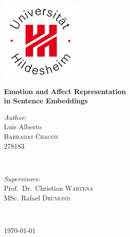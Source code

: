\documentclass[a4paper,12pt]{report}
\begin{document}
\begin{titlepage}
\center %

\vspace{-1cm}
\includegraphics[width=4cm]{img/logoUHi.jpg}
\vspace{2cm}

{ \Large \bfseries Emotion and Affect Representation}\\
\vspace{0.5cm}
{ \Large \bfseries in Sentence Embeddings}\\
\vspace{0.5cm}
\vspace{2cm}

\begin{minipage}{0.4\textwidth}
  \begin{flushleft} \large
  \emph{Author:}\\
  Luis Alberto \\
  \textsc{Barradas Chacón} \\
  278183 \\
  \end{flushleft}
\end{minipage}
~
\begin{minipage}{0.5\textwidth}
  \begin{flushright} \large
  \emph{Supervisors:} \\
  Prof.\ Dr.\ Christian \textsc{Wartena} \\
  MSc. Rafael \textsc{Drumond}
  \end{flushright}
\end{minipage}\\
\vspace{2cm}

{ \today}\\ %
\vspace{1cm}


\end{titlepage}
\end{document}
